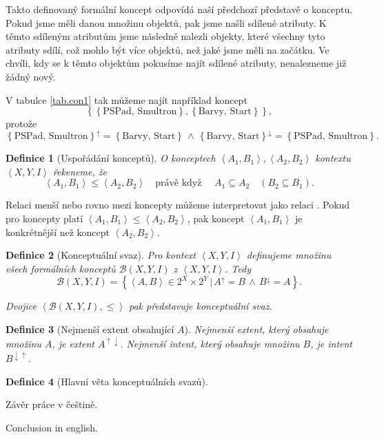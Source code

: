 \documentclass[12pt]{article}
\newcommand{\sep}{\,|\,}
\newcommand{\pravekdyz}{\mbox{právě když }}
\newcommand{\adds}[1]{\left\{#1\right\}}
\newcommand{\addsp}[1]{\left<#1\right>}
\newcommand{\logand}{\,\wedge\,}
\newcommand{\context}{\addsp{X, Y, I}}
\newcommand{\lattice}{\mathcal{B}(X, Y, I)}
\newcommand{\up}{^{\uparrow}}
\newcommand{\down}{^{\downarrow}}
\newcommand{\updown}{^{\uparrow\downarrow}}
\newcommand{\downup}{^{\downarrow\uparrow}}
\newtheorem{mydef}{Definice}
\begin{document}
Takto definovaný formální koncept odpovídá naší předchozí představě o konceptu. Pokud jsme měli danou množinu objektů, pak jsme našli sdílené atributy. K těmto sdíleným atributům jsme následně nalezli objekty, které všechny tyto atributy sdílí, což mohlo být více objektů, než jaké jsme měli na začátku. Ve chvíli, kdy se k těmto objektům pokusíme najít sdílené atributy, nenalezneme již žádný nový.

V tabulce \ref{tab.con1} tak můžeme najít například koncept 
$$\adds{\adds{\mbox{PSPad, Smultron}}, \adds{\mbox{Barvy, Start}}},$$ 
protože 
$$\adds{\mbox{PSPad, Smultron}}\up=\adds{\mbox{Barvy, Start}} \logand \adds{\mbox{Barvy, Start}}\down=\adds{\mbox{PSPad, Smultron}}.$$


\begin{mydef}[Uspořádání konceptů]
\label{def.order}
O konceptech $\addsp{A_1, B_1}, \addsp{A_2, B_2}$ kontextu $\context$ řekeneme, že
$$\addsp{A_1, B_1}\le\addsp{A_2, B_2}\quad\pravekdyz\quad A_1\subseteq A_2 \quad(B_2\subseteq B_1).$$
\end{mydef}

Relaci menší nebo rovno mezi koncepty můžeme interpretovat jako relaci . Pokud pro koncepty platí $\addsp{A_1, B_1}\le\addsp{A_2, B_2}$, pak koncept $\addsp{A_1, B_1}$ je konkrétnější než koncept $\addsp{A_2, B_2}$. 

\begin{mydef}[Konceptuální svaz]
Pro kontext $\context$ definujeme množinu všech formálních konceptů $\lattice$ z $\context$. Tedy
$$\lattice=\adds{\addsp{A, B}\in 2^X\times 2^Y\sep A\up=B\logand B\down=A}.$$

Dvojice $\addsp{\lattice, \le}$ pak představuje konceptuální svaz. 
\end{mydef}

\begin{mydef}[Nejmenší extent obsahující $A$]
Nejmenší extent, který obsahuje množinu $A$, je extent $A\updown$. Nejmenší intent, který obsahuje množinu $B$, je intent $B\downup$. 
\end{mydef}

\begin{mydef}[Hlavní věta konceptuálních svazů]

\end{mydef}

\begin{conclusions-cz}
  Závěr práce v češtině.
\end{conclusions-cz}


\begin{conclusions-en}
  Conclusion in english.
\end{conclusions-en}
\end{document}
